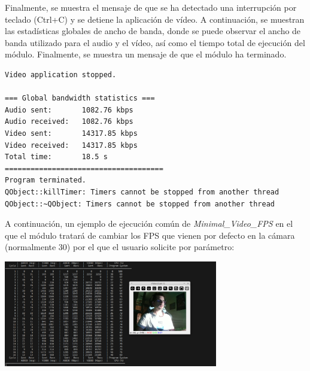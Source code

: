 Finalmente, se muestra el mensaje de que se ha detectado una interrupción por teclado (Ctrl+C) y se detiene la aplicación de vídeo. A continuación, se muestran las estadísticas globales de ancho de banda, donde se puede observar el ancho de banda utilizado para el audio y el vídeo, así como el tiempo total de ejecución del módulo. Finalmente, se muestra un mensaje de que el módulo ha terminado.
\begin{lstlisting}[language=bash,basicstyle=\ttfamily\scriptsize]
Video application stopped.

=== Global bandwidth statistics ===
Audio sent:       1082.76 kbps
Audio received:   1082.76 kbps
Video sent:       14317.85 kbps
Video received:   14317.85 kbps
Total time:       18.5 s
=====================================
Program terminated.
QObject::killTimer: Timers cannot be stopped from another thread
QObject::~QObject: Timers cannot be stopped from another thread
\end{lstlisting}
\vspace{\baselineskip}

A continuación, un ejemplo de ejecución común de \textit{Minimal\_Video\_FPS} en el que el módulo tratará de cambiar los FPS que vienen por defecto en la cámara (normalmente 30) por el que el usuario solicite por parámetro:
\begin{center}
	\includegraphics[width = 0.7\textwidth]{images/pruebas/ejecuion_normal_fps.png}
	\label{fig:ejecucion_fps}
\end{center}
\vspace{\baselineskip}

